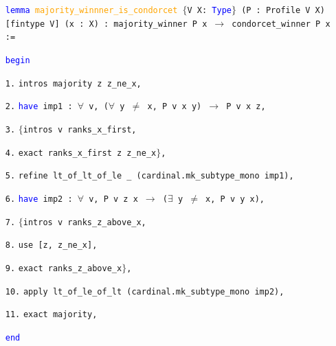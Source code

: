 \documentclass[runningheads]{llncs}
\begin{document}
\begin{itemize}
\item[] \texttt{\textcolor{blue}{lemma} \textcolor{orange}{majority\_winnner\_is\_condorcet} $\{$V X: \textcolor{blue}{Type}$\}$ (P : Profile V X) [fintype V] (x : X) : majority\_winner P x $\to$ condorcet\_winner P x :=}

\textcolor{blue}{\texttt{begin}}

\item[\texttt{1.}]\quad  \texttt{intros majority z z\_ne\_x,}
 
 

\item[\texttt{2.}]\quad  \texttt{\textcolor{blue}{have} imp1 : $\forall$ v, ($\forall$ y $\neq$ x, P v x y) $\to$ P v x z,}

\item[\texttt{3.}]\quad\quad  \texttt{$\{$intros v ranks\_x\_first,}

\item[\texttt{4.}]\quad\quad     \texttt{exact ranks\_x\_first z z\_ne\_x$\}$, }
  
\item[\texttt{5.}]\quad  \texttt{refine lt\_of\_lt\_of\_le \_ (cardinal.mk\_subtype\_mono imp1),}
 
\item[\texttt{6.}]\quad  \texttt{\textcolor{blue}{have} imp2 : $\forall$ v, P v z x $\to$ ($\exists$ y $\neq$ x, P v y x),}
 
 \item[\texttt{7.}]\quad \quad    \texttt{$\{$intros v ranks\_z\_above\_x, }
  
 \item[\texttt{8.}]\quad \quad    \texttt{use [z, z\_ne\_x], }
  
 \item[\texttt{9.}]\quad \quad    \texttt{exact ranks\_z\_above\_x$\}$,}
  
 \item[\texttt{10.}]\quad  \texttt{apply lt\_of\_le\_of\_lt (cardinal.mk\_subtype\_mono imp2),}
  
\item[\texttt{11.}]\quad  \texttt{exact majority, }
  
\textcolor{blue}{\texttt{end}}
\end{itemize}
\end{document}

